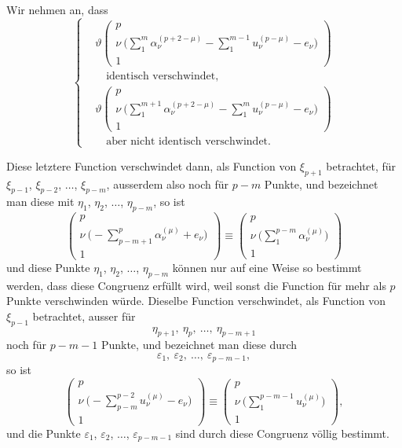 \documentclass[12pt,a4paper]{article}
\begin{document}
Wir nehmen an, dass
\begin{equation}
\tag{1}
\left\{
\begin{aligned}
&\vartheta\left(\begin{array}{c} p\\ \nu\ \bigl(\sum\limits_1^m \alpha_\nu^{(p+2-\mu)} - \sum\limits_1^{m-1} u_\nu^{(p-\mu)} - e_\nu\bigr)\\ 1 \end{array}\right)\\
&\quad\text{identisch verschwindet,}\\
&\vartheta\left(\begin{array}{c} p\\ \nu\ \bigl(\sum\limits_1^{m+1} \alpha_\nu^{(p+2-\mu)} - \sum\limits_1^m u_\nu^{(p-\mu)} - e_\nu\bigr)\\ 1 \end{array}\right)\\
&\quad\text{aber nicht identisch verschwindet.}
\end{aligned}
\right.
\end{equation}

Diese letztere Function verschwindet dann, als Function von $\xi_{p+1}$ betrachtet, für $\xi_{p-1}$, $\xi_{p-2}$, $\ldots$, $\xi_{p-m}$, ausserdem also noch für $p-m$ Punkte, und bezeichnet man diese mit $\eta_1$, $\eta_2$, $\ldots$, $\eta_{p-m}$, so ist
\[ \left(\begin{array}{c} p\\ \nu\ \bigl(-\sum\limits_{p-m+1}^p \alpha_\nu^{(\mu)} + e_\nu\bigr)\\ 1 \end{array}\right) \equiv \left(\begin{array}{c} p\\ \nu\ \bigl(\sum\limits_1^{p-m} \alpha_\nu^{(\mu)}\bigr)\\ 1 \end{array}\right) \]
und diese Punkte $\eta_1$, $\eta_2$, $\ldots$, $\eta_{p-m}$ können nur auf eine Weise so bestimmt werden, dass diese Congruenz erfüllt wird, weil sonst die Function für mehr als $p$ Punkte verschwinden würde. Dieselbe Function verschwindet, als Function von $\xi_{p-1}$ betrachtet, ausser für
\[ \eta_{p+1},\ \eta_p,\ \ldots,\ \eta_{p-m+1} \]
noch für $p-m-1$ Punkte, und bezeichnet man diese durch
\[ \varepsilon_1,\ \varepsilon_2,\ \ldots,\ \varepsilon_{p-m-1}, \]
so ist
\[ \left(\begin{array}{c} p\\ \nu\ \bigl(-\sum\limits_{p-m}^{p-2} u_\nu^{(\mu)} - e_\nu\bigr)\\ 1 \end{array}\right) \equiv \left(\begin{array}{c} p\\ \nu\ \bigl(\sum\limits_1^{p-m-1} u_\nu^{(\mu)}\bigr)\\ 1 \end{array}\right), \]
und die Punkte $\varepsilon_1$, $\varepsilon_2$, $\ldots$, $\varepsilon_{p-m-1}$ sind durch diese Congruenz völlig bestimmt.
\end{document}
